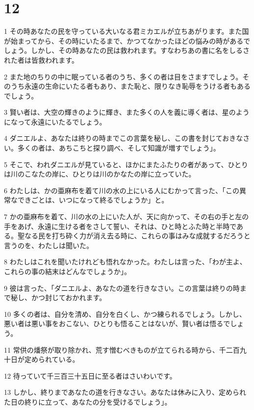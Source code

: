 \chapter{12}

\par 1 その時あなたの民を守っている大いなる君ミカエルが立ちあがります。また国が始まってから、その時にいたるまで、かつてなかったほどの悩みの時があるでしょう。しかし、その時あなたの民は救われます。すなわちあの書に名をしるされた者は皆救われます。
\par 2 また地のちりの中に眠っている者のうち、多くの者は目をさますでしょう。そのうち永遠の生命にいたる者もあり、また恥と、限りなき恥辱をうける者もあるでしょう。
\par 3 賢い者は、大空の輝きのように輝き、また多くの人を義に導く者は、星のようになって永遠にいたるでしょう。
\par 4 ダニエルよ、あなたは終りの時までこの言葉を秘し、この書を封じておきなさい。多くの者は、あちこちと探り調べ、そして知識が増すでしょう」。
\par 5 そこで、われダニエルが見ていると、ほかにまたふたりの者があって、ひとりは川のこなたの岸に、ひとりは川のかなたの岸に立っていた。
\par 6 わたしは、かの亜麻布を着て川の水の上にいる人にむかって言った、「この異常なできごとは、いつになって終るでしょうか」と。
\par 7 かの亜麻布を着て、川の水の上にいた人が、天に向かって、その右の手と左の手をあげ、永遠に生ける者をさして誓い、それは、ひと時とふた時と半時である。聖なる民を打ち砕く力が消え去る時に、これらの事はみな成就するだろうと言うのを、わたしは聞いた。
\par 8 わたしはこれを聞いたけれども悟れなかった。わたしは言った、「わが主よ、これらの事の結末はどんなでしょうか」。
\par 9 彼は言った、「ダニエルよ、あなたの道を行きなさい。この言葉は終りの時まで秘し、かつ封じておかれます。
\par 10 多くの者は、自分を清め、自分を白くし、かつ練られるでしょう。しかし、悪い者は悪い事をおこない、ひとりも悟ることはないが、賢い者は悟るでしょう。
\par 11 常供の燔祭が取り除かれ、荒す憎むべきものが立てられる時から、千二百九十日が定められている。
\par 12 待っていて千三百三十五日に至る者はさいわいです。
\par 13 しかし、終りまであなたの道を行きなさい。あなたは休みに入り、定められた日の終りに立って、あなたの分を受けるでしょう」。


